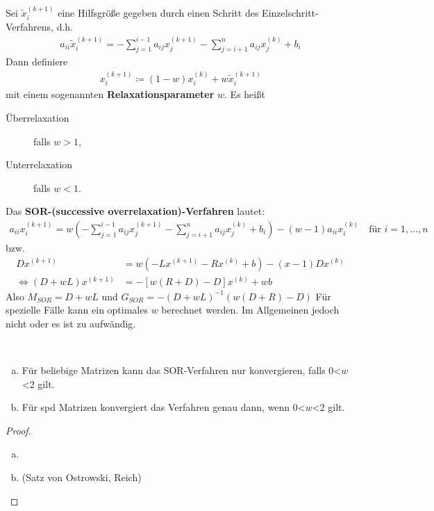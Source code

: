 Sei $\widetilde{x}_i^{(k+1)}$ eine Hilfsgröße gegeben
durch einen Schritt des Einzelschritt-Verfahrens, d.h.
\begin{gather}
  a_{ii}\widetilde{x}_i^{(k+1)} = -\sum_{j=1}^{i-1}a_{ij}x_j^{(k+1)}
  -\sum_{j=i+1}^{n}a_{ij}x_j^{(k)}
  +b_i
\label{IX.4.1}
\end{gather}
Dann definiere
\begin{gather}
  x_i^{(k+1)} \coloneqq (1-w)x_i^{(k)}+w\widetilde{x}_i^{(k+1)}
  \label{IX.4.2}
\end{gather}
mit einem sogenannten
\textbf{Relaxationsparameter} $w$.
Es heißt
\begin{description}
\item[Überrelaxation] falls $w>1$,
\item[Unterrelaxation] falls $w<1$.
\end{description}
Das \textbf{SOR-(successive
  overrelaxation)-Verfahren}
lautet:
\begin{gather}
  a_{ii}x_i^{(k+1)}=w\left(-\sum_{j=1}^{i-1}a_{ij}x_j^{(k+1)}
  -\sum_{j=i+1}^{n}a_{ij}x_j^{(k)}+b_i\right)
-(w-1)a_{ii}x_i^{(k)}\quad \text{für } i=1,\ldots,n
\label{IX.4.3}
\end{gather}
bzw.
\begin{align*}
  Dx^{(k+1)}&=w(-Lx^{(k+1)}-Rx^{(k)}+b) -(x-1)Dx^{(k)}\\
\Leftrightarrow (D+wL)x^{(k+1)} &=
-\left[ w(R+D)-D \right]x^{(k)}+wb
\end{align*}
Also $M_{SOR} = D+wL$ und $G_{SOR}= -(D+wL)^{-1}(w(D+R)-D)$
Für spezielle Fälle kann ein optimales $w$ berechnet werden.
Im Allgemeinen jedoch nicht oder es ist zu aufwändig.

\begin{Satze}~
  \begin{enumerate}[a)]
  \item Für beliebige Matrizen kann das SOR-Verfahren nur
    konvergieren, falls 0<$w$<2 gilt.
  \item Für spd Matrizen konvergiert das Verfahren genau dann, wenn
    0<$w$<2 gilt.
  \end{enumerate}
\begin{proof}~
  \begin{enumerate}[a)]
  \item \cite{stoerbulirsch}
  \item (Satz von Ostrowski, Reich)
  \end{enumerate}
\end{proof}
\end{Satze}

